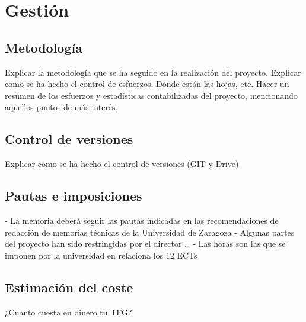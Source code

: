 \chapter{Gestión} \label{gestion}
\section{Metodología} \label{gestion.metodologia}
Explicar la metodología que se ha seguido en la realización del proyecto. Explicar como se ha hecho el control de esfuerzos. Dónde están las hojas, etc. Hacer un resúmen de los esfuerzos y estadísticas contabilizadas del proyecto, mencionando aquellos puntos de más interés. 

\section{Control de versiones} \label{gestion.control}
Explicar como se ha hecho el control de versiones (GIT y Drive) 
\section{Pautas e imposiciones} \label{gestion.pautas}
- La memoria deberá seguir las pautas indicadas en las recomendaciones de redacción de memorias técnicas de la Universidad de Zaragoza
- Algunas partes del proyecto han sido restringidas por el director … 
- Las horas son las que se imponen por la universidad en relaciona los 12 ECTs

\section{Estimación del coste} \label{gestion.estimacion}
¿Cuanto cuesta en dinero tu TFG?

